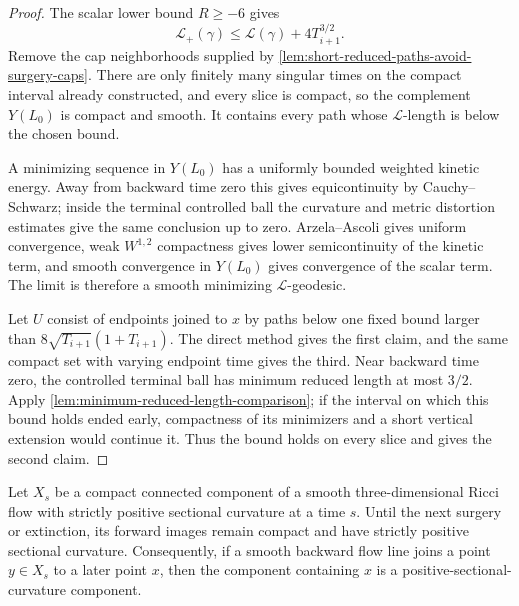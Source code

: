 \begin{proof}
The scalar lower bound $R\ge-6$ gives
\[
 \mathcal L_+(\gamma)
 \le\mathcal L(\gamma)+4T_{i+1}^{3/2}.
\]
Remove the cap neighborhoods supplied by
\ref{lem:short-reduced-paths-avoid-surgery-caps}.  There are only finitely
many singular times on the compact interval already constructed, and every
slice is compact, so the complement $Y(L_0)$ is compact and smooth.  It
contains every path whose $\mathcal L$-length is below the chosen bound.

A minimizing sequence in $Y(L_0)$ has a uniformly bounded weighted kinetic
energy.  Away from backward time zero this gives equicontinuity by
Cauchy--Schwarz; inside the terminal controlled ball the curvature and metric
distortion estimates give the same conclusion up to zero.  Arzela--Ascoli
gives uniform convergence, weak $W^{1,2}$ compactness gives lower
semicontinuity of the kinetic term, and smooth convergence in $Y(L_0)$ gives
convergence of the scalar term.  The limit is therefore a smooth minimizing
$\mathcal L$-geodesic.

Let $U$ consist of endpoints joined to $x$ by paths below one fixed bound
larger than $8\sqrt{T_{i+1}}(1+T_{i+1})$.  The direct method gives the first
claim, and the same compact set with varying endpoint time gives the third.
Near backward time zero, the controlled terminal ball has minimum reduced
length at most $3/2$.  Apply
\ref{lem:minimum-reduced-length-comparison}; if the interval on which this
bound holds ended early, compactness of its minimizers and a short vertical
extension would continue it.  Thus the bound holds on every slice and gives
the second claim.
\end{proof}

\begin{lemma}
\label{lem:positive-component-persistence}
\notready
Let $X_s$ be a compact connected component of a smooth three-dimensional
Ricci flow with strictly positive sectional curvature at a time $s$.  Until
the next surgery or extinction, its forward images remain compact and have
strictly positive sectional curvature.  Consequently, if a smooth backward
flow line joins a point $y\in X_s$ to a later point $x$, then the component
containing $x$ is a positive-sectional-curvature component.
\end{lemma}

